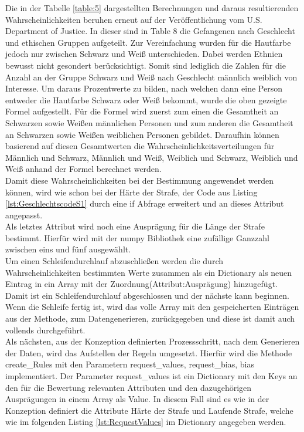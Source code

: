 \begin{onehalfspace}
Die in der Tabelle \ref{table:5} dargestellten Berechnungen und daraus resultierenden Wahrscheinlichkeiten beruhen erneut auf der Veröffentlichung vom U.S. Department of Justice. In dieser sind in \glqq{}Table 8\grqq{} die Gefangenen nach Geschlecht und ethischen Gruppen aufgeteilt. Zur Vereinfachung wurden für die Hautfarbe jedoch nur zwischen Schwarz und Weiß unterschieden. Dabei werden Ethnien bewusst nicht gesondert berücksichtigt. Somit sind lediglich die Zahlen für die Anzahl an der Gruppe Schwarz und Weiß nach Geschlecht männlich weiblich von Interesse. Um daraus Prozentwerte zu bilden, nach welchen dann eine Person entweder die Hautfarbe Schwarz oder Weiß bekommt, wurde die oben gezeigte Formel aufgestellt. Für die Formel wird zuerst zum einen die Gesamtheit an Schwarzen sowie Weißen männlichen Personen und zum anderen die Gesamtheit an Schwarzen sowie Weißen weiblichen Personen gebildet. Daraufhin können basierend auf diesen Gesamtwerten die Wahrscheinlichkeitsverteilungen für Männlich und Schwarz, Männlich und Weiß, Weiblich und Schwarz, Weiblich und Weiß anhand der Formel berechnet werden.\\
Damit diese Wahrscheinlichkeiten bei der Bestimmung angewendet werden können, wird wie schon bei der Härte der Strafe, der Code aus Listing \ref{lst:GeschlechtscodeS1} durch eine if Abfrage erweitert und an dieses Attribut angepasst.\\
Als letztes Attribut wird noch eine Ausprägung für die Länge der Strafe bestimmt. Hierfür wird mit der \glqq{}numpy\grqq{} Bibliothek eine zufällige Ganzzahl zwischen eins und fünf ausgewählt.\\
Um einen Schleifendurchlauf abzuschließen werden die durch Wahrscheinlichkeiten bestimmten Werte zusammen als ein Dictionary als neuen Eintrag in ein Array mit der Zuordnung(Attribut:Ausprägung) hinzugefügt. Damit ist ein Schleifendurchlauf abgeschlossen und der nächste kann beginnen. Wenn die Schleife fertig ist, wird das volle Array mit den gespeicherten Einträgen aus der Methode, zum Datengenerieren, zurückgegeben und diese ist damit auch vollends durchgeführt.\\
Als nächsten, aus der Konzeption definierten Prozessschritt, nach dem Generieren der Daten, wird das Aufstellen der Regeln umgesetzt. Hierfür wird die Methode \glqq{}create\_Rules\grqq{} mit den Parametern \glqq{}request\_values, request\_bias, bias\grqq{} implementiert. Der Parameter \glqq{}request\_values\grqq{} ist ein Dictionary mit den Keys an den für die Bewertung relevanten Attributen und den dazugehörigen Ausprägungen in einem Array als Value. In diesem Fall sind es wie in der Konzeption definiert die Attribute Härte der Strafe und Laufende Strafe, welche wie im folgenden Listing \ref{lst:RequestValues} im Dictionary angegeben werden.\\

\end{onehalfspace}
